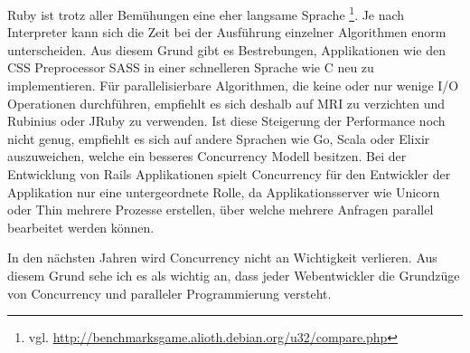 Ruby ist trotz aller Bemühungen eine eher langsame Sprache \footnote{vgl. \url{http://benchmarksgame.alioth.debian.org/u32/compare.php}}. Je nach Interpreter kann sich die Zeit bei der Ausführung einzelner Algorithmen enorm unterscheiden. Aus diesem Grund gibt es Bestrebungen, Applikationen wie den CSS Preprocessor SASS in einer schnelleren Sprache wie C neu zu implementieren. Für parallelisierbare Algorithmen, die keine oder nur wenige I/O Operationen durchführen, empfiehlt es sich deshalb auf MRI zu verzichten und Rubinius oder JRuby zu verwenden. Ist diese Steigerung der Performance noch nicht genug, empfiehlt es sich auf andere Sprachen wie Go, Scala oder Elixir auszuweichen, welche ein besseres Concurrency Modell besitzen. Bei der Entwicklung von Rails Applikationen spielt Concurrency für den Entwickler der Applikation nur eine untergeordnete Rolle, da Applikationsserver wie Unicorn oder Thin mehrere Prozesse erstellen, über welche mehrere Anfragen parallel bearbeitet werden können.

In den nächsten Jahren wird Concurrency nicht an Wichtigkeit verlieren. Aus diesem Grund sehe ich es als wichtig an, dass jeder Webentwickler die Grundzüge von Concurrency und paralleler Programmierung versteht.